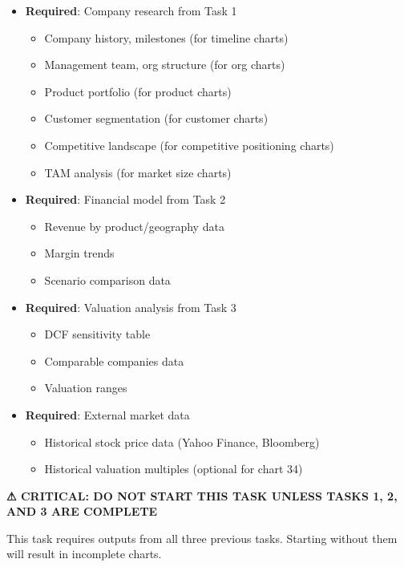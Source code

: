 \documentclass[11pt]{article}
\begin{document}
\begin{itemize}[leftmargin=*,itemsep=2pt,topsep=2pt]
\item {} \textbf{Required}: Company research from Task 1
\begin{itemize}[leftmargin=*,itemsep=2pt,topsep=2pt]
\item {} Company history, milestones (for timeline charts)
\item {} Management team, org structure (for org charts)
\item {} Product portfolio (for product charts)
\item {} Customer segmentation (for customer charts)
\item {} Competitive landscape (for competitive positioning charts)
\item {} TAM analysis (for market size charts)
\end{itemize}
\item {} \textbf{Required}: Financial model from Task 2
\begin{itemize}[leftmargin=*,itemsep=2pt,topsep=2pt]
\item {} Revenue by product/geography data
\item {} Margin trends
\item {} Scenario comparison data
\end{itemize}
\item {} \textbf{Required}: Valuation analysis from Task 3
\begin{itemize}[leftmargin=*,itemsep=2pt,topsep=2pt]
\item {} DCF sensitivity table
\item {} Comparable companies data
\item {} Valuation ranges
\end{itemize}
\item {} \textbf{Required}: External market data
\begin{itemize}[leftmargin=*,itemsep=2pt,topsep=2pt]
\item {} Historical stock price data (Yahoo Finance, Bloomberg)
\item {} Historical valuation multiples (optional for chart 34)
\end{itemize}
\end{itemize}

\textbf{⚠ CRITICAL: DO NOT START THIS TASK UNLESS TASKS 1, 2, AND 3 ARE COMPLETE}


This task requires outputs from all three previous tasks. Starting without them will result in incomplete charts.
\end{document}
